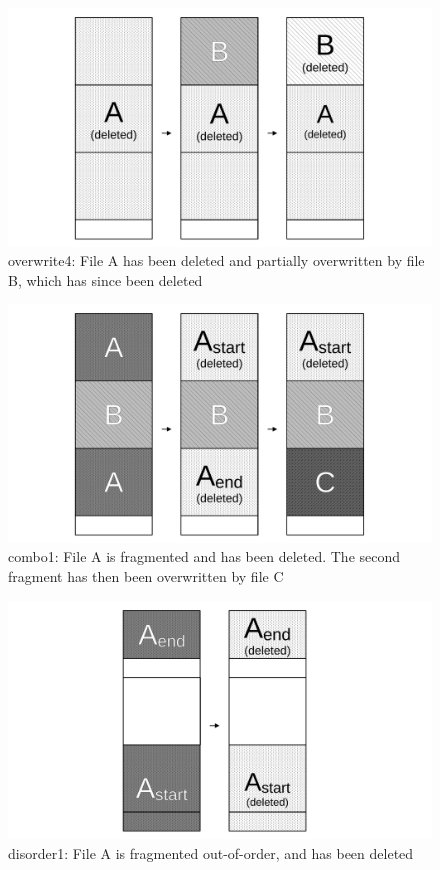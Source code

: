 \begin{figure}[h]
    \centering
    \includegraphics[width=\linewidth]{fig/case8.pdf}
    \caption{overwrite4: File A has been deleted and partially overwritten by file B, which has since been deleted}
    \label{fig:case8}
\end{figure}

\begin{figure}[h]
    \centering
    \includegraphics[width=\linewidth]{fig/case12.pdf}
    \caption{combo1: File A is fragmented and has been deleted. The second fragment has then been overwritten by file C}
    \label{fig:case12}
\end{figure}

\begin{figure}[h]
        \centering
        \includegraphics[width=\linewidth]{fig/case14.pdf}
        \caption{disorder1: File A is fragmented out-of-order, and has been deleted}
        \label{fig:case14}
\end{figure}


